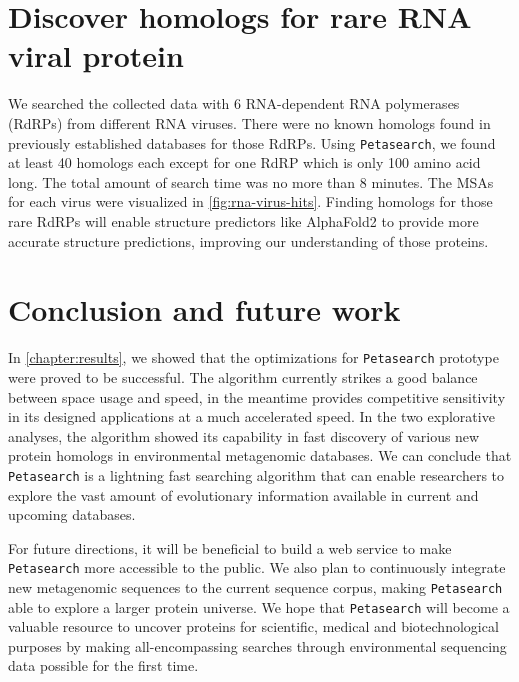 \section{Discover homologs for rare RNA viral protein} \label{section:discover-homologs-for-rare-rna-virus-protein}

We searched the collected data with 6 RNA-dependent RNA polymerases (RdRPs) from different RNA viruses. There were no known homologs found in previously established databases for those RdRPs. Using \texttt{Petasearch}, we found at least 40 homologs each except for one RdRP which is only 100 amino acid long. The total amount of search time was no more than 8 minutes. The MSAs for each virus were visualized in \autoref{fig:rna-virus-hits}. Finding homologs for those rare RdRPs will enable structure predictors like AlphaFold2 to provide more accurate structure predictions, improving our understanding of those proteins.

\section{Conclusion and future work} \label{section:conclusion-and-future-work}

In \cref{chapter:results}, we showed that the optimizations for \texttt{Petasearch} prototype were proved to be successful. The algorithm currently strikes a good balance between space usage and speed, in the meantime provides competitive sensitivity in its designed applications at a much accelerated speed. In the two explorative analyses, the algorithm showed its capability in fast discovery of various new protein homologs in environmental metagenomic databases. We can conclude that \texttt{Petasearch} is a lightning fast searching algorithm that can enable researchers to explore the vast amount of evolutionary information available in current and upcoming databases.

For future directions, it will be beneficial to build a web service to make \texttt{Petasearch} more accessible to the public. We also plan to continuously integrate new metagenomic sequences to the current sequence corpus, making \texttt{Petasearch} able to explore a larger protein universe. We hope that \texttt{Petasearch} will become a valuable resource to uncover proteins for scientific,
medical and biotechnological purposes by making all-encompassing searches through environmental sequencing data possible for the first time.


